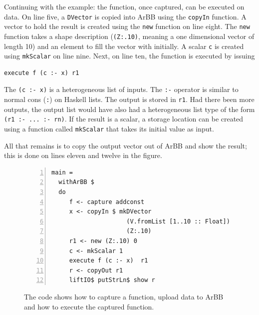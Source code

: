 
Continuing with the example: the function, once captured, can be executed 
on data. On line five, a {\tt DVector} is copied into ArBB using the {\tt copyIn} function. 
A vector to hold the result is created using the {\tt new} function on line eight. The 
{\tt new} function takes a shape description ({\tt (Z:.10)}, meaning a one dimensional 
vector of length 10) and an element to fill the vector with initially.
A scalar {\tt c} is created using {\tt mkScalar} on line nine. Next, on line ten, the 
function is executed by issuing 
\begin{verbatim}
execute f (c :- x) r1
\end{verbatim}
The {\tt (c :- x)} is a heterogeneous list of inputs. 
The {\tt :-} operator is similar to normal cons ({\tt :}) on Haskell lists.  
The output is stored in {\tt r1}. Had there been more outputs, the output
list would have also had a heterogeneous list type of the form
{\tt (r1 :- ... :- rn)}. If the result is a 
scalar, a storage location can be created using a function called 
{\tt mkScalar} that takes its initial value as input. 

All that remains is to copy the output vector out of ArBB and show the result; this 
is done on lines eleven and twelve in the figure.  

\begin{figure}
\begin{Verbatim}[numbers=left,frame=single] 
main = 
  withArBB $ 
  do 
     f <- capture addconst             
     x <- copyIn $ mkDVector 
                     (V.fromList [1..10 :: Float]) 
                     (Z:.10)
     r1 <- new (Z:.10) 0 
     c <- mkScalar 1      
     execute f (c :- x)  r1              
     r <- copyOut r1              
     liftIO$ putStrLn$ show r
\end{Verbatim}
\caption{The code shows how to capture a function, upload data to ArBB and 
         how to execute the captured function.}
\label{fig:code1}
\end{figure}  

